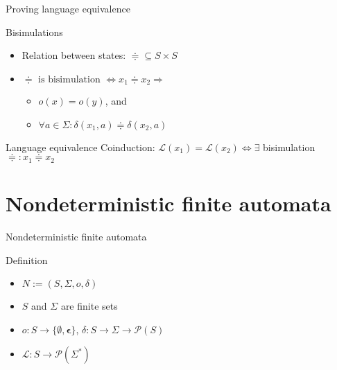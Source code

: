 \documentclass[compress]{beamer}
\begin{document}
\begin{frame}{Proving language equivalence}
  \begin{block}{Bisimulations}
    \begin{itemize}
      \item Relation between states: $\doteqdot \subseteq S \times S$
      \item $\doteqdot \text{ is bisimulation } \Leftrightarrow x_1 \doteqdot x_2 \Rightarrow $
        \begin{itemize}
          \item $o(x) = o(y)$, and
          \item $\forall a \in \Sigma: \delta(x_1, a) \doteqdot \delta(x_2, a)$
        \end{itemize}
    \end{itemize}
   \end{block}

   \begin{block}{Language equivalence}
     Coinduction:
     $\mathcal{L}(x_1) = \mathcal{L}(x_2) \Leftrightarrow \exists$ bisimulation $\doteqdot: x_1 \doteqdot x_2$
   \end{block}
\end{frame}

\section{Nondeterministic finite automata}

\begin{frame}{Nondeterministic finite automata}
  \begin{block}{Definition}
    \begin{itemize}
      \item $N := (S, \Sigma, o, \delta)$
      \item $S$ and $\Sigma$ are finite sets
      \item $o : S \to \{\emptyset, \mathbf{\epsilon} \}$,
            $\delta : S \to \Sigma \to \mathcal{P}(S)$
      \item $\mathcal{L} : S \to \mathcal{P}(\Sigma^\ast)$
    \end{itemize}
  \end{block}
\end{frame}
\end{document}

